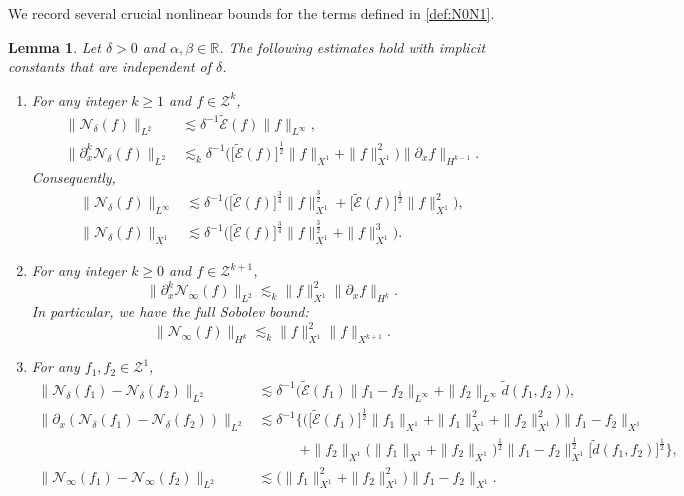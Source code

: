 \documentclass{amsart}
\newtheorem{lemma}[proposition]{Lemma}
\numberwithin{equation}{section}
\begin{document}
We record several crucial nonlinear bounds for the terms defined in \eqref{def:N0N1}.
\begin{lemma}\label{lem:N0N1}
Let $\delta>0$ and $\alpha, \beta \in \mathbb{R}$. The following estimates hold with implicit constants that are independent of $\delta$.
\begin{enumerate}
\item[$\mathrm{(i)}$] For any integer $k\geq 1$ and $f\in \mathcal{Z}^k$,
\begin{align*}
\| \mathcal{N}_\delta(f)\|_{L^2}&\lesssim \delta^{-1}\widetilde{\mathcal{E}}(f)\| f\|_{L^\infty}, \\
\| \partial_x^k\mathcal{N}_\delta(f)\|_{L^2}&\lesssim_k \delta^{-1}\Big( \big[ \widetilde{\mathcal{E}}(f)\big]^{\frac12}\| f\|_{X^1}+\| f\|_{X^1}^2\Big) \| \partial_xf\|_{H^{k-1}}.
\end{align*}
Consequently, 
\begin{align*}
\| \mathcal{N}_\delta(f)\|_{L^\infty}&\lesssim \delta^{-1}\Big( \big[ \widetilde{\mathcal{E}}(f)\big] ^{\frac34} \| f\|_{X^1}^{\frac32}+\big[ \widetilde{\mathcal{E}}(f)\big] ^{\frac12}\| f\|_{X^1}^2\Big), \\
\| \mathcal{N}_\delta(f)\|_{X^1}&\lesssim \delta^{-1}\Big( \big[ \widetilde{\mathcal{E}}(f)\big] ^{\frac34} \| f\|_{X^1}^{\frac32}+\| f\|_{X^1}^3\Big).
\end{align*}
\item[$\mathrm{(ii)}$] For any integer $k\geq 0$ and $f\in \mathcal{Z}^{k+1}$, 
\[ \| \partial_x^k\mathcal{N}_\infty(f)\|_{L^2}\lesssim_k \| f\|_{X^1}^2\| \partial_xf\|_{H^k}.\]
In particular, we have the full Sobolev bound:
\[ \| \mathcal{N}_\infty(f)\|_{H^k}\lesssim_k \| f\|_{X^1}^2\| f\|_{X^{k+1}}.\]
\item[$\mathrm{(iii)}$] For any $f_1,f_2\in \mathcal{Z}^1$, 
\begin{align*}
\| \mathcal{N}_\delta(f_1)-\mathcal{N}_\delta(f_2)\|_{L^2}&\lesssim \delta^{-1}\Big( \widetilde{\mathcal{E}}(f_1)\| f_1-f_2\|_{L^\infty} +\| f_2\|_{L^\infty} \widetilde{d}(f_1,f_2)\Big) , \\
\| \partial_x(\mathcal{N}_\delta(f_1)-\mathcal{N}_\delta(f_2))\|_{L^2}&\lesssim \delta^{-1}\Big\{ \Big( \big[ \widetilde{\mathcal{E}}(f_1)\big] ^{\frac12} \| f_1\|_{X^1}+\| f_1\|_{X^1}^2+\| f_2\|_{X^1}^2\Big)\| f_1-f_2\|_{X^1}\\
&\quad\qquad +\| f_2\|_{X^1}\big( \| f_1\|_{X^1}+\| f_2\|_{X^1}\big)^{\frac12}\| f_1-f_2\|_{X^1}^{\frac12}\big[ \widetilde{d}(f_1,f_2)\big] ^{\frac12} \Big\} ,\\
\| \mathcal{N}_\infty(f_1)-\mathcal{N}_\infty(f_2)\|_{L^2}&\lesssim
\big( \| f_1\|_{X^1}^2+\| f_2\|_{X^1}^2\big) \| f_1-f_2\|_{X^1}.
\end{align*}
\end{enumerate}
\end{lemma}
\end{document}
